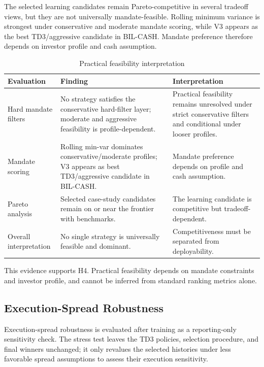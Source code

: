 \documentclass[12pt]{article}
\begin{document}
The selected learning candidates remain Pareto-competitive in several tradeoff views, but they are not universally mandate-feasible. Rolling minimum variance is strongest under conservative and moderate mandate scoring, while V3 appears as the best TD3/aggressive candidate in BIL-CASH. Mandate preference therefore depends on investor profile and cash assumption.

\begin{table}[htbp]
\centering
\caption{Practical feasibility interpretation}
\scriptsize
\begin{tabularx}{\textwidth}{L{0.24\textwidth}L{0.36\textwidth}Y}
\toprule
\textbf{Evaluation} & \textbf{Finding} & \textbf{Interpretation} \\
\midrule
Hard mandate filters & No strategy satisfies the conservative hard-filter layer; moderate and aggressive feasibility is profile-dependent. & Practical feasibility remains unresolved under strict conservative filters and conditional under looser profiles. \\
Mandate scoring & Rolling min-var dominates conservative/moderate profiles; V3 appears as best TD3/aggressive candidate in BIL-CASH. & Mandate preference depends on profile and cash assumption. \\
Pareto analysis & Selected case-study candidates remain on or near the frontier with benchmarks. & The learning candidate is competitive but tradeoff-dependent. \\
Overall interpretation & No single strategy is universally feasible and dominant. & Competitiveness must be separated from deployability. \\
\bottomrule
\end{tabularx}
\end{table}

This evidence supports H4. Practical feasibility depends on mandate constraints and investor profile, and cannot be inferred from standard ranking metrics alone.

\subsection{Execution-Spread Robustness}

Execution-spread robustness is evaluated after training as a reporting-only sensitivity check. The stress test leaves the TD3 policies, selection procedure, and final winners unchanged; it only revalues the selected histories under less favorable spread assumptions to assess their execution sensitivity.
\end{document}
